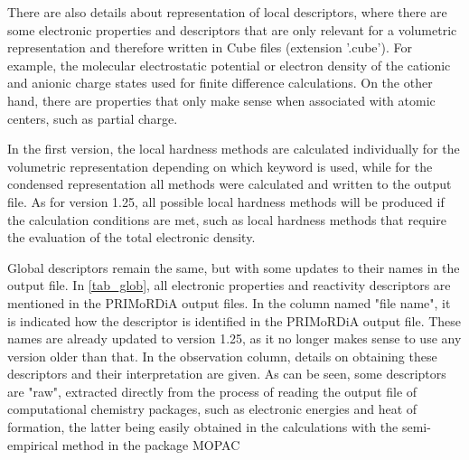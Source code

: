 \documentclass[a4paper,11pt]{refart}
\begin{document}
There are also details about representation of local descriptors, where there are some electronic properties and descriptors that are only relevant for a volumetric representation and therefore written in Cube files (extension '.cube'). For example, the molecular electrostatic potential or electron density of the cationic and anionic charge states used for finite difference calculations. On the other hand, there are properties that only make sense when associated with atomic centers, such as partial charge.

In the first version, the local hardness methods are calculated individually for the volumetric representation depending on which keyword is used, while for the condensed representation all methods were calculated and written to the output file. As for version 1.25, all possible local hardness methods will be produced if the calculation conditions are met, such as local hardness methods that require the evaluation of the total electronic density.

Global descriptors remain the same, but with some updates to their names in the output file. In \autoref{tab_glob}, all electronic properties and reactivity descriptors are mentioned in the PRIMoRDiA output files. In the column named "file name", it is indicated how the descriptor is identified in the PRIMoRDiA output file. These names are already updated to version 1.25, as it no longer makes sense to use any version older than that. In the observation column, details on obtaining these descriptors and their interpretation are given. As can be seen, some descriptors are "raw", extracted directly from the process of reading the output file of computational chemistry packages, such as electronic energies and heat of formation, the latter being easily obtained in the calculations with the semi-empirical method in the package MOPAC
\end{document}

